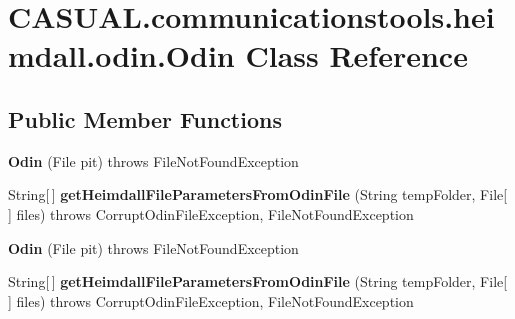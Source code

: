\hypertarget{class_c_a_s_u_a_l_1_1communicationstools_1_1heimdall_1_1odin_1_1_odin}{\section{C\-A\-S\-U\-A\-L.\-communicationstools.\-heimdall.\-odin.\-Odin Class Reference}
\label{class_c_a_s_u_a_l_1_1communicationstools_1_1heimdall_1_1odin_1_1_odin}
}
\subsection*{Public Member Functions}
\begin{DoxyCompactItemize}
\item 
\hypertarget{class_c_a_s_u_a_l_1_1communicationstools_1_1heimdall_1_1odin_1_1_odin_a223c492e7461f639301cd8d8e4bc6caa}{{\bfseries Odin} (File pit)  throws File\-Not\-Found\-Exception }\label{class_c_a_s_u_a_l_1_1communicationstools_1_1heimdall_1_1odin_1_1_odin_a223c492e7461f639301cd8d8e4bc6caa}

\item 
\hypertarget{class_c_a_s_u_a_l_1_1communicationstools_1_1heimdall_1_1odin_1_1_odin_a5d0b8bdb174e08dd9a10ef523a947ecc}{String\mbox{[}$\,$\mbox{]} {\bfseries get\-Heimdall\-File\-Parameters\-From\-Odin\-File} (String temp\-Folder, File\mbox{[}$\,$\mbox{]} files)  throws Corrupt\-Odin\-File\-Exception, File\-Not\-Found\-Exception }\label{class_c_a_s_u_a_l_1_1communicationstools_1_1heimdall_1_1odin_1_1_odin_a5d0b8bdb174e08dd9a10ef523a947ecc}

\item 
\hypertarget{class_c_a_s_u_a_l_1_1communicationstools_1_1heimdall_1_1odin_1_1_odin_a223c492e7461f639301cd8d8e4bc6caa}{{\bfseries Odin} (File pit)  throws File\-Not\-Found\-Exception }\label{class_c_a_s_u_a_l_1_1communicationstools_1_1heimdall_1_1odin_1_1_odin_a223c492e7461f639301cd8d8e4bc6caa}

\item 
\hypertarget{class_c_a_s_u_a_l_1_1communicationstools_1_1heimdall_1_1odin_1_1_odin_a5d0b8bdb174e08dd9a10ef523a947ecc}{String\mbox{[}$\,$\mbox{]} {\bfseries get\-Heimdall\-File\-Parameters\-From\-Odin\-File} (String temp\-Folder, File\mbox{[}$\,$\mbox{]} files)  throws Corrupt\-Odin\-File\-Exception, File\-Not\-Found\-Exception }\label{class_c_a_s_u_a_l_1_1communicationstools_1_1heimdall_1_1odin_1_1_odin_a5d0b8bdb174e08dd9a10ef523a947ecc}

\end{DoxyCompactItemize}



